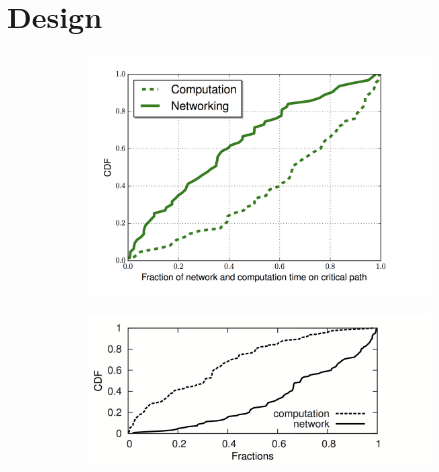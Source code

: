 \section{Design}
\label{sec:design}

\begin{figure}[!bth]
\begin{subfigure}[b]{0.5\textwidth}
\centering
\includegraphics[width=\linewidth]{figs/comp_net.png}
\label{fig:mobile-runtime}
\end{subfigure}
\begin{subfigure}[b]{0.5\textwidth}
\centering
\includegraphics[width=\linewidth]{figs/comp_net_desk.png}
\label{fig:mobile-runtime}
\end{subfigure}
\end{figure}

